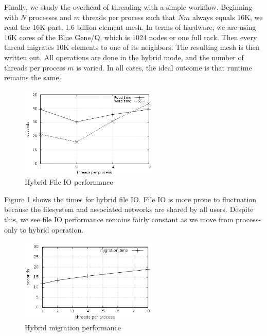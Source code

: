 \documentclass[final,1p,times]{elsarticle}
\begin{document}
Finally, we study the overhead of threading with
a simple workflow.
Beginning with $N$ processes and $m$ threads per process
such that $Nm$ always equals 16K, we read the 16K-part,
1.6 billion element mesh.
In terms of hardware, we are using 16K cores of the Blue Gene/Q,
which is 1024 nodes or one full rack.
Then every thread migrates 10K elements to one of its
neighbors.
The resulting mesh is then written out.
All operations are done in the hybrid mode, and the
number of threads per process $m$ is varied.
In all cases, the ideal outcome is that runtime
remains the same.

\begin{figure}[!ht]
\begin{center}
\caption{Hybrid File IO performance}
\label{fig:fileio}
\includegraphics[width=0.6\textwidth]{fileio.png}
\end{center}
\end{figure}

Figure \ref{fig:fileio} shows the times for hybrid file IO.
File IO is more prone to fluctuation because the filesystem
and associated networks are shared by all users.
Despite this, we see file IO performance remains
fairly constant as we move from process-only to hybrid operation.

\begin{figure}[!ht]
\begin{center}
\caption{Hybrid migration performance}
\label{fig:migrate}
\includegraphics[width=0.6\textwidth]{migrate.png}
\end{center}
\end{figure}
\end{document}
